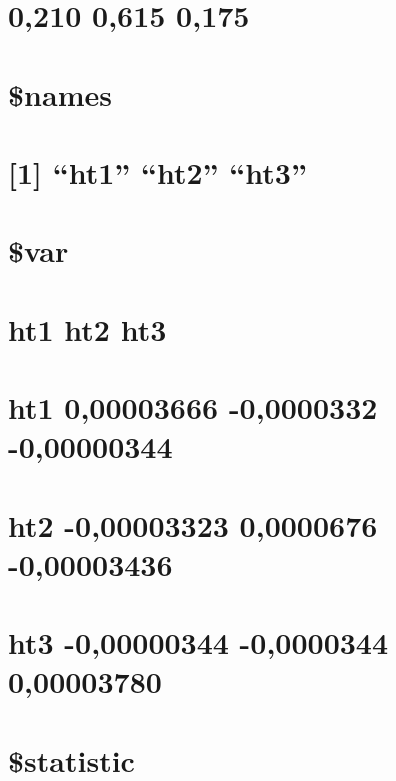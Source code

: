 \documentclass[]{book}
\theoremstyle{definition}
\theoremstyle{definition}
\theoremstyle{definition}
\theoremstyle{remark}
\begin{document}
\section{0,210 0,615 0,175}\label{section-38}

\section{\$names}\label{names}

\section{\texorpdfstring{{[}1{]} ``ht1'' ``ht2''
``ht3''}{{[}1{]} ht1 ht2 ht3}}\label{ht1-ht2-ht3-1}

\section{}\label{section-39}

\section{\$var}\label{var}

\section{ht1 ht2 ht3}\label{ht1-ht2-ht3-2}

\section{ht1 0,00003666 -0,0000332
-0,00000344}\label{ht1-000003666--00000332--000000344}

\section{ht2 -0,00003323 0,0000676
-0,00003436}\label{ht2--000003323-00000676--000003436}

\section{ht3 -0,00000344 -0,0000344
0,00003780}\label{ht3--000000344--00000344-000003780}

\section{}\label{section-40}

\section{\$statistic}\label{statistic}
\end{document}
